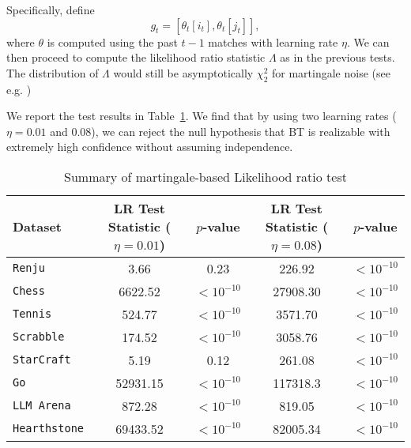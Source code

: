 Specifically, define
\[
g_t = [\theta_{t}[i_t], \theta_{t}[j_t]],
\]
where $\theta$ is computed using the past $t-1$ matches with learning rate $\eta$. We can then proceed to compute the likelihood ratio statistic $\Lambda$ as in the previous tests. The distribution of $\Lambda$ would still be asymptotically $\chi_2^2$ for martingale noise (see e.g. \citet[Theorem 1.5.1]{kedem2005regression})

We report the test results in Table~\ref{tab:hypotheis-martingale}. We find that by using two learning rates ($\eta=0.01$ and $0.08$), we can reject the null hypothesis that BT is realizable with extremely high confidence without assuming independence. 

\begin{table}[t]
\centering
\addtocounter{footnote}{+1}  
\begin{tabular}{|l|c|c||c|c|}
\hline
Dataset              & LR Test Statistic ($\eta=0.01$) & $p$-value   & LR Test Statistic ($\eta=0.08$) & $p$-value         \\ \hline
\texttt{Renju}       & 3.66                            & 0.23        & 226.92                          & $<10^{-10}$       \\

\texttt{Chess}       & 6622.52                         & $<10^{-10}$       & 27908.30                        & $<10^{-10}$       \\
\texttt{Tennis}      & 524.77                          & $<10^{-10}$       & 3571.70                         & $<10^{-10}$ \\
\texttt{Scrabble}    & 174.52                          & $<10^{-10}$       & 3058.76                         & $<10^{-10}$       \\
\texttt{StarCraft}   & 5.19                            & 0.12        & 261.08                          &$<10^{-10}$      \\
\texttt{Go}          & 52931.15                        & $<10^{-10}$        & 117318.3                        & $<10^{-10}$                \\
\texttt{LLM Arena}   & 872.28                          & $<10^{-10}$ & 819.05                          & $<10^{-10}$            \\

\texttt{Hearthstone}          & 69433.52                      & $<10^{-10}$        & 82005.34                             & $<10^{-10}$                \\
\hline
\end{tabular}
\caption{Summary of martingale-based Likelihood ratio test}
\label{tab:hypotheis-martingale}
\end{table}

